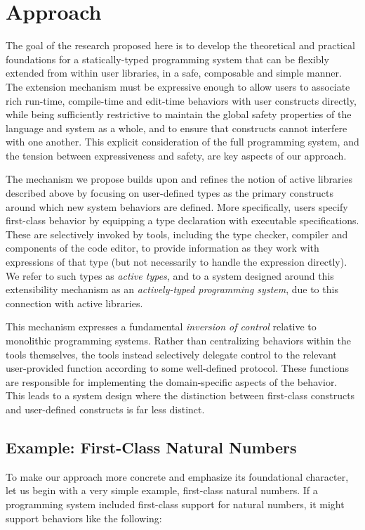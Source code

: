 \newcommand{\nat}{\textbf{nat}}
\newcommand{\natz}{\textbf{z}}
\newcommand{\nats}[1]{\textbf{s}(#1)}
\newcommand{\natrec}[3]{\textbf{natrec}(#1, #2, #3)}
\renewcommand{\ttdefault}{txtt}

\section{Approach}

The goal of the research proposed here is to develop the theoretical and practical foundations for a statically-typed programming system that can be flexibly extended from within user libraries, in a safe, composable and simple manner. The extension mechanism must be expressive enough to allow users to associate rich run-time, compile-time and edit-time behaviors with user constructs directly, while being sufficiently restrictive to maintain the global safety properties of the language and system as a whole, and to ensure that constructs cannot interfere with one another. This explicit consideration of the full programming system, and the tension between expressiveness and safety, are key aspects of our approach.

The mechanism we propose builds upon and refines the notion of active libraries described above by focusing on user-defined types as the primary constructs around which new system behaviors are defined. More specifically, users specify first-class behavior by equipping a type declaration with executable specifications. These are selectively invoked by tools, including the type checker, compiler and components of the code editor, to provide information as they work with expressions of that type (but not necessarily to handle the expression directly). We refer to such types as \emph{active types}, and to a system designed around this extensibility mechanism as an \emph{actively-typed programming system}, due to this connection with active libraries.

This mechanism expresses a fundamental \emph{inversion of control} relative to monolithic programming systems. Rather than centralizing behaviors within the tools themselves, the tools instead selectively delegate control to the relevant user-provided function according to some well-defined protocol. These functions are responsible for implementing the domain-specific aspects of the behavior. This leads to a system design where the distinction between first-class constructs and user-defined constructs is far less distinct. 

\subsection{Example: First-Class Natural Numbers}
To make our approach more concrete and emphasize its foundational character, let us begin with a very simple example, first-class natural numbers. If a programming system included first-class support for natural numbers, it might support behaviors like the following:

